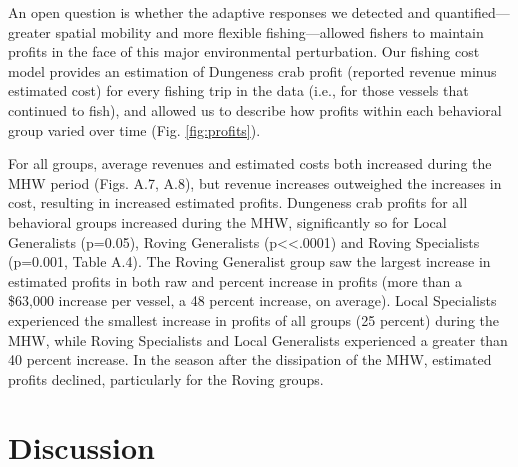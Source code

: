 \documentclass[]{elsarticle} %
\begin{document}
An open question is whether the adaptive responses we detected and
quantified---greater spatial mobility and more flexible
fishing---allowed fishers to maintain profits in the face of this major
environmental perturbation. Our fishing cost model provides an
estimation of Dungeness crab profit (reported revenue minus estimated
cost) for every fishing trip in the data (i.e., for those vessels that
continued to fish), and allowed us to describe how profits within each
behavioral group varied over time (Fig. \ref{fig:profits}).

For all groups, average revenues and estimated costs both increased
during the MHW period (Figs. A.7, A.8), but revenue increases outweighed
the increases in cost, resulting in increased estimated profits.
Dungeness crab profits for all behavioral groups increased during the
MHW, significantly so for Local Generalists (p=0.05), Roving Generalists
(p\textless\textless.0001) and Roving Specialists (p=0.001, Table A.4).
The Roving Generalist group saw the largest increase in estimated
profits in both raw and percent increase in profits (more than a
\$63,000 increase per vessel, a 48 percent increase, on average). Local
Specialists experienced the smallest increase in profits of all groups
(25 percent) during the MHW, while Roving Specialists and Local
Generalists experienced a greater than 40 percent increase. In the
season after the dissipation of the MHW, estimated profits declined,
particularly for the Roving groups.

\hypertarget{discussion}{%
\section{Discussion}\label{discussion}}
\end{document}
